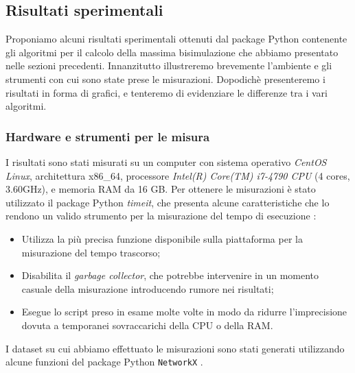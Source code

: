 \subsection{Risultati sperimentali}
\label{sec:results}
Proponiamo alcuni risultati sperimentali ottenuti dal package Python contenente gli algoritmi per il calcolo della massima bisimulazione che abbiamo presentato nelle sezioni precedenti. Innanzitutto illustreremo brevemente l'ambiente e gli strumenti con cui sono state prese le misurazioni. Dopodichè presenteremo i risultati in forma di grafici, e tenteremo di evidenziare le differenze tra i vari algoritmi.

\subsubsection{Hardware e strumenti per le misura}
I risultati sono stati misurati su un computer con sistema operativo \emph{CentOS Linux}, architettura x86\_64, processore \emph{Intel(R) Core(TM) i7-4790 CPU} (4 cores, 3.60GHz), e memoria RAM da 16 GB. Per ottenere le misurazioni è stato utilizzato il package Python \emph{timeit}, che presenta alcune caratteristiche che lo rendono un valido strumento per la misurazione del tempo di esecuzione \cite{pythondocs}:
\begin{itemize}
    \item Utilizza la più precisa funzione disponibile sulla piattaforma per la misurazione del tempo trascorso;
    \item Disabilita il \emph{garbage collector}, che potrebbe intervenire in un momento casuale della misurazione introducendo rumore nei risultati;
    \item Esegue lo script preso in esame molte volte in modo da ridurre l'imprecisione dovuta a temporanei sovraccarichi della CPU o della RAM.
\end{itemize}

I dataset su cui abbiamo effettuato le misurazioni sono stati generati utilizzando alcune funzioni del package Python \texttt{NetworkX} \cite{networkx}.

